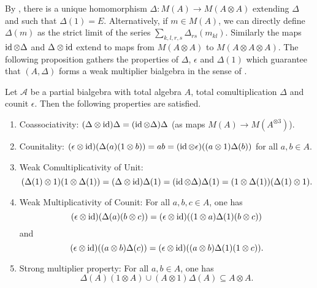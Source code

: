 By \cite[Proposition A.3]{VDW2}, there is a unique homomorphism $\Delta:M(A)\rightarrow M(A\otimes A)$ extending $\Delta$ and such that $\Delta(1) = E$. Alternatively, if $m\in M(A)$, we can directly define $\Delta(m)$ as the strict limit of the series $\sum_{k,l,r,s} \Delta_{rs}(m_{kl})$. Similarly the maps $\operatorname{id}\otimes \Delta$ and $\Delta\otimes \operatorname{id}$ extend to maps from $M(A\otimes A)$ to $M(A\otimes A\otimes A)$. The following proposition gathers the properties of $\Delta$, $\epsilon$ and $\Delta(1)$ which guarantee that $(A,\Delta)$ forms a weak multiplier bialgebra in the sense of \cite[Definition 2.1]{Boh1}.

\begin{Prop} Let $\mathscr{A}$ be a partial bialgebra with total algebra $A$, total comultiplication $\Delta$ and counit $\epsilon$. Then the following properties are satisfied.
\begin{enumerate}[label={(\arabic*)}]
\item Coassociativity: $(\Delta\otimes \operatorname{id})\Delta = (\operatorname{id}\otimes \Delta)\Delta$ (as maps $M(A)\rightarrow M(A^{\otimes 3})$).
\item Counitality: $(\epsilon\otimes \operatorname{id})(\Delta(a)(1\otimes b)) = ab = (\operatorname{id}\otimes \epsilon)((a\otimes 1)\Delta(b))$ for all $a,b\in A$.
\item Weak Comultiplicativity of Unit: \[(\Delta(1)\otimes 1)(1\otimes \Delta(1)) = (\Delta\otimes \operatorname{id})\Delta(1) = (\operatorname{id}\otimes \Delta)\Delta(1) = (1\otimes \Delta(1))(\Delta(1)\otimes 1).\]
\item \label{WMC} Weak Multiplicativity of Counit: For all $a,b,c\in A$, one has \[(\epsilon\otimes \operatorname{id})(\Delta(a)(b\otimes c)) = (\epsilon\otimes \operatorname{id})((1\otimes a)\Delta(1)(b\otimes c))\] and 
\[(\epsilon\otimes \operatorname{id})((a\otimes b)\Delta(c)) = (\epsilon\otimes \operatorname{id})((a\otimes b)\Delta(1)(1\otimes c)).\]
\item Strong multiplier property: For all $a,b\in A$, one has \[\Delta(A)(1\otimes A)\cup (A\otimes 1)\Delta(A)\subseteq  A\otimes A.\] 
\end{enumerate}
\end{Prop}

